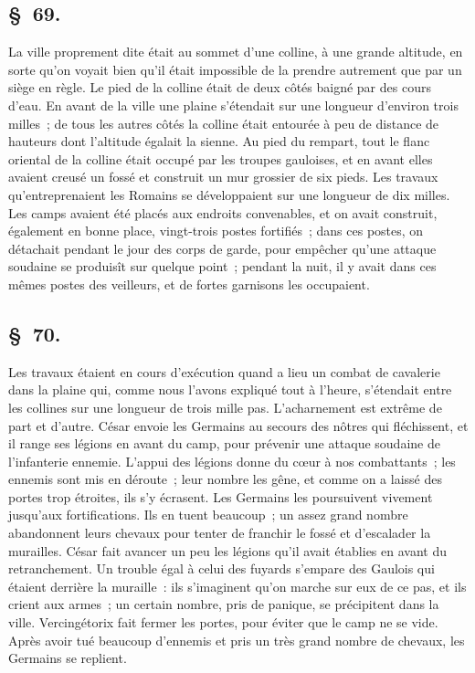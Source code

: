 \documentclass[french,twoside]{book} %
\begin{document}
\subsection[{§ 69.}]{ \textsc{§ 69.} }
\noindent La ville proprement dite était au sommet d’une colline, à une grande altitude, en sorte qu’on voyait bien qu’il était impossible de la prendre autrement que par un siège en règle. Le pied de la colline était de deux côtés baigné par des cours d’eau. En avant de la ville une plaine s’étendait sur une longueur d’environ trois milles ; de tous les autres côtés la colline était entourée à peu de distance de hauteurs dont l’altitude égalait la sienne. Au pied du rempart, tout le flanc oriental de la colline était occupé par les troupes gauloises, et en avant elles avaient creusé un fossé et construit un mur grossier de six pieds. Les travaux qu’entreprenaient les Romains se développaient sur une longueur de dix milles. Les camps avaient été placés aux endroits convenables, et on avait construit, également en bonne place, vingt-trois postes fortifiés ; dans ces postes, on détachait pendant le jour des corps de garde, pour empêcher qu’une attaque soudaine se produisît sur quelque point ; pendant la nuit, il y avait dans ces mêmes postes des veilleurs, et de fortes garnisons les occupaient.
\subsection[{§ 70.}]{ \textsc{§ 70.} }
\noindent Les travaux étaient en cours d’exécution quand a lieu un combat de cavalerie dans la plaine qui, comme nous l’avons expliqué tout à l’heure, s’étendait entre les collines sur une longueur de trois mille pas. L'acharnement est extrême de part et d’autre. César envoie les Germains au secours des nôtres qui fléchissent, et il range ses légions en avant du camp, pour prévenir une attaque soudaine de l’infanterie ennemie. L'appui des légions donne du cœur à nos combattants ; les ennemis sont mis en déroute ; leur nombre les gêne, et comme on a laissé des portes trop étroites, ils s’y écrasent. Les Germains les poursuivent vivement jusqu’aux fortifications. Ils en tuent beaucoup ; un assez grand nombre abandonnent leurs chevaux pour tenter de franchir le fossé et d’escalader la murailles. César fait avancer un peu les légions qu’il avait établies en avant du retranchement. Un trouble égal à celui des fuyards s’empare des Gaulois qui étaient derrière la muraille : ils s’imaginent qu’on marche sur eux de ce pas, et ils crient aux armes ; un certain nombre, pris de panique, se précipitent dans la ville. Vercingétorix fait fermer les portes, pour éviter que le camp ne se vide. Après avoir tué beaucoup d’ennemis et pris un très grand nombre de chevaux, les Germains se replient.
\end{document}
